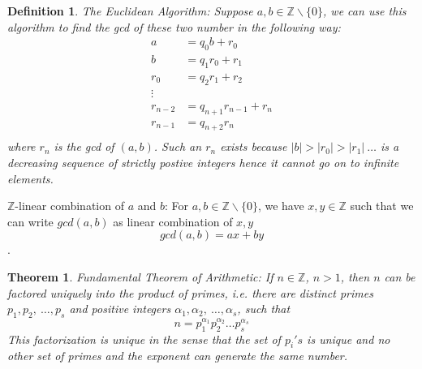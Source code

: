 \documentclass[12pt]{report}
\newtheorem{thm}{Theorem}
\newtheorem{defn}{Definition}
\begin{document}
\begin{defn}
    The Euclidean Algorithm: Suppose $a,b \in \mathbb{Z}\backslash\{0\}$, we can use this algorithm to find the gcd of these two number in the following way:
    \begin{align*}
        a &= q_0b + r_0\\
        b &= q_1r_0 + r_1\\
        r_0 &= q_2r_1 + r_2\\
        \vdots \\
        r_{n-2} &= q_{n+1}r_{n-1} + r_{n}\\
        r_{n-1} &= q_{n+2}r_{n} \\
    \end{align*}
    where $r_n$ is the gcd of $(a,b)$. Such an $r_n$ exists because $|b| > |r_0| > |r_1| ~\dots $ is a decreasing sequence of strictly postive integers hence it cannot go on to infinite elements.
\end{defn}
$\mathbb{Z}$-linear combination of $a$ and $b$: For $a,b \in \mathbb{Z}\backslash\{0\}$, we have $x,y\in \mathbb{Z}$ such that we can write $gcd(a,b)$ as linear combination of $x,y$ $$ gcd(a,b) = ax + by$$. 
\begin{thm}
    Fundamental Theorem of Arithmetic: If $n \in \mathbb{Z}$, $n > 1$, then $n$ can be factored uniquely into the product of primes, i.e. there are distinct primes $p_1, p_2, ~\dots,p_s$ and positive integers $\alpha_1, \alpha_2, ~\dots, \alpha_s$, such that
    $$ n = p_1^{\alpha_1} p_2^{\alpha_2} \dots p_s^{\alpha_s} $$ 
    This factorization is unique in the sense that the set of $p_i's$ is unique and no other set of primes and the exponent can generate the same number.
\end{thm}
\end{document}
